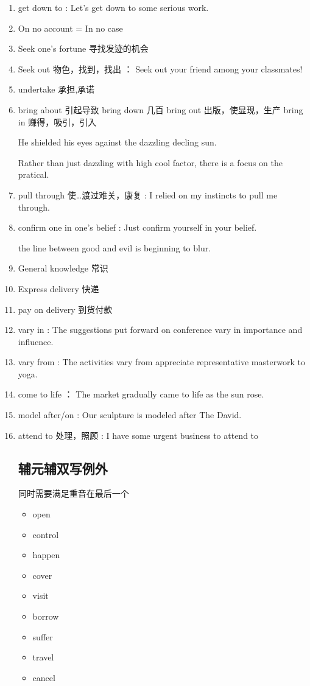 \documentclass[utf8]{ctexart}
\begin{document}
\begin{enumerate}
				\item get down to : Let's get down to some serious work.
				\item On no account = In no case
				\item Seek one's fortune 寻找发迹的机会
				\item Seek out 物色，找到，找出 ： Seek out your friend among your classmates!
				\item undertake 承担,承诺
				\item bring about 引起导致 bring down 几百 bring out 出版，使显现，生产 bring in 赚得，吸引，引入
				\par He shielded his eyes against the dazzling decling sun.		
				\par Rather than just dazzling with high cool factor, there is a focus on the pratical.
				\item pull through 使\ldots 渡过难关，康复 : I relied on my instincts to pull me through.
				\item confirm one in one's belief : Just confirm yourself in your belief.	
				\par the line between good and evil is beginning to blur.	
				 \item General knowledge 常识
				 \item Express delivery 快递
				 \item pay on delivery 到货付款
				 \item vary in : The suggestions put forward on conference vary in importance and influence.
				 \item vary from : The activities vary from appreciate representative masterwork to yoga.
				 \item come to life ： The market gradually came to life as the sun rose.
				 \item model after/on : Our sculpture is modeled after The David.
				 \item attend to 处理，照顾 : I have some urgent business to attend to  			
						 
					
		
			


		\subsection{辅元辅双写例外}
		同时需要满足重音在最后一个
		\begin{itemize}
				\item open
				\item control	
				\item happen
				\item cover
				\item visit
				\item borrow
				\item suffer
				\item travel
				\item cancel			
						
		\end{itemize}
		

		\end{enumerate}
\end{document}
